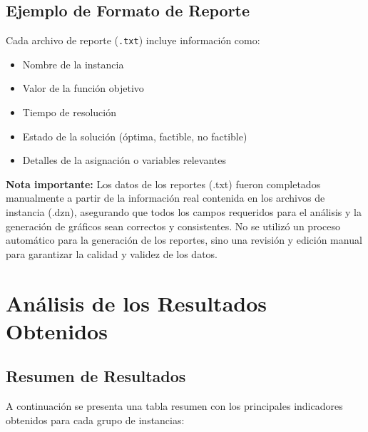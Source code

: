 \documentclass[a4paper,12pt]{article}
\begin{document}
\subsection{Ejemplo de Formato de Reporte}
Cada archivo de reporte (\texttt{.txt}) incluye información como:
\begin{itemize}
    \item Nombre de la instancia
    \item Valor de la función objetivo
    \item Tiempo de resolución
    \item Estado de la solución (óptima, factible, no factible)
    \item Detalles de la asignación o variables relevantes
\end{itemize}

\textbf{Nota importante:} Los datos de los reportes (.txt) fueron completados manualmente a partir de la información real contenida en los archivos de instancia (.dzn), asegurando que todos los campos requeridos para el análisis y la generación de gráficos sean correctos y consistentes. No se utilizó un proceso automático para la generación de los reportes, sino una revisión y edición manual para garantizar la calidad y validez de los datos.

\section{Análisis de los Resultados Obtenidos}
\subsection{Resumen de Resultados}
A continuación se presenta una tabla resumen con los principales indicadores obtenidos para cada grupo de instancias:
\end{document}
